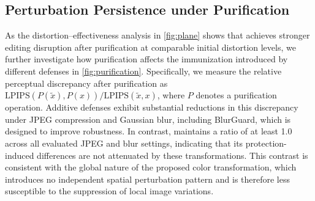\subsection{Perturbation Persistence under Purification}
\label{sec:exp_persistence}
As the distortion–effectiveness analysis in \cref{fig:plane} shows that \capg{} achieves stronger editing disruption after purification at comparable initial distortion levels, we further investigate how purification affects the immunization introduced by different defenses in \cref{fig:purification}. Specifically, we measure the relative perceptual discrepancy after purification as $\mathrm{LPIPS}(P(\tilde{x}),P(x))/\mathrm{LPIPS}(\tilde{x},x)$, where $P$ denotes a purification operation. Additive defenses exhibit substantial reductions in this discrepancy under JPEG compression and Gaussian blur, including BlurGuard, which is designed to improve robustness. In contrast, \capg{} maintains a ratio of at least 1.0 across all evaluated JPEG and blur settings, indicating that its protection-induced differences are not attenuated by these transformations. This contrast is consistent with the global nature of the proposed color transformation, which introduces no independent spatial perturbation pattern and is therefore less susceptible to the suppression of local image variations. 








